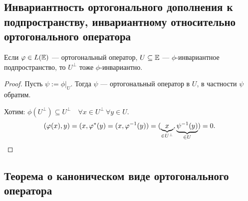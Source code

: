 \subsection{Инвариантность ортогонального дополнения к подпространству, инвариантному относительно ортогонального оператора}

\begin{proposal}
    Если $\phi \in L(\EE)$ --- ортогональный оператор, $U \subseteq \EE$ --- $\phi$-инвариантное подпространство, то $U^{\perp}$ тоже $\phi$-инвариантно.
\end{proposal}

\begin{proof}
    Пусть $\psi := \phi\big|_U$. Тогда $\psi$ --- ортогональный оператор в $U$, в частности $\psi$ обратим.

    Хотим: $\phi(U^{\perp}) \subseteq U^{\perp} \quad \forall x \in U^{\perp} \ \forall y \in U$.
    \begin{equation*}
        (\phi(x), y) = (x, \phi^{*}(y) = (x, \phi^{-1}(y)) = (\underbrace{x}_{\in U^{\perp}}, \underbrace{\psi^{-1}(y)}_{\in U}) = 0
    .\qedhere\end{equation*}
\end{proof}


\subsection{Теорема о каноническом виде ортогонального оператора}

